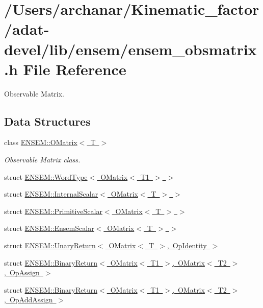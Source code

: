 \hypertarget{adat-devel_2lib_2ensem_2ensem__obsmatrix_8h}{}\section{/\+Users/archanar/\+Kinematic\+\_\+factor/adat-\/devel/lib/ensem/ensem\+\_\+obsmatrix.h File Reference}
\label{adat-devel_2lib_2ensem_2ensem__obsmatrix_8h}


Observable Matrix.  


\subsection*{Data Structures}
\begin{DoxyCompactItemize}
\item 
class \mbox{\hyperlink{classENSEM_1_1OMatrix}{E\+N\+S\+E\+M\+::\+O\+Matrix$<$ T $>$}}
\begin{DoxyCompactList}\small\item\em Observable Matrix class. \end{DoxyCompactList}\item 
struct \mbox{\hyperlink{structENSEM_1_1WordType_3_01OMatrix_3_01T1_01_4_01_4}{E\+N\+S\+E\+M\+::\+Word\+Type$<$ O\+Matrix$<$ T1 $>$ $>$}}
\item 
struct \mbox{\hyperlink{structENSEM_1_1InternalScalar_3_01OMatrix_3_01T_01_4_01_4}{E\+N\+S\+E\+M\+::\+Internal\+Scalar$<$ O\+Matrix$<$ T $>$ $>$}}
\item 
struct \mbox{\hyperlink{structENSEM_1_1PrimitiveScalar_3_01OMatrix_3_01T_01_4_01_4}{E\+N\+S\+E\+M\+::\+Primitive\+Scalar$<$ O\+Matrix$<$ T $>$ $>$}}
\item 
struct \mbox{\hyperlink{structENSEM_1_1EnsemScalar_3_01OMatrix_3_01T_01_4_01_4}{E\+N\+S\+E\+M\+::\+Ensem\+Scalar$<$ O\+Matrix$<$ T $>$ $>$}}
\item 
struct \mbox{\hyperlink{structENSEM_1_1UnaryReturn_3_01OMatrix_3_01T_01_4_00_01OpIdentity_01_4}{E\+N\+S\+E\+M\+::\+Unary\+Return$<$ O\+Matrix$<$ T $>$, Op\+Identity $>$}}
\item 
struct \mbox{\hyperlink{structENSEM_1_1BinaryReturn_3_01OMatrix_3_01T1_01_4_00_01OMatrix_3_01T2_01_4_00_01OpAssign_01_4}{E\+N\+S\+E\+M\+::\+Binary\+Return$<$ O\+Matrix$<$ T1 $>$, O\+Matrix$<$ T2 $>$, Op\+Assign $>$}}
\item 
struct \mbox{\hyperlink{structENSEM_1_1BinaryReturn_3_01OMatrix_3_01T1_01_4_00_01OMatrix_3_01T2_01_4_00_01OpAddAssign_01_4}{E\+N\+S\+E\+M\+::\+Binary\+Return$<$ O\+Matrix$<$ T1 $>$, O\+Matrix$<$ T2 $>$, Op\+Add\+Assign $>$}}

\end{DoxyCompactItemize}
